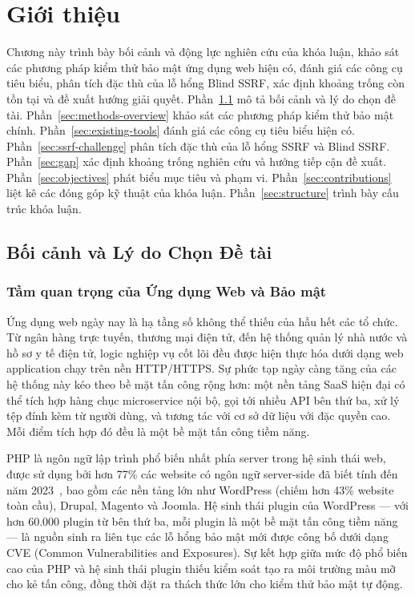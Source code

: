 ﻿\chapter{Giới thiệu}

Chương này trình bày bối cảnh và động lực nghiên cứu của khóa luận, khảo sát các
phương pháp kiểm thử bảo mật ứng dụng web hiện có, đánh giá các công cụ tiêu biểu,
phân tích đặc thù của lỗ hổng Blind SSRF, xác định khoảng trống còn tồn tại và đề
xuất hướng giải quyết.
Phần~\ref{sec:motivation} mô tả bối cảnh và lý do chọn đề tài.
Phần~\ref{sec:methods-overview} khảo sát các phương pháp kiểm thử bảo mật chính.
Phần~\ref{sec:existing-tools} đánh giá các công cụ tiêu biểu hiện có.
Phần~\ref{sec:ssrf-challenge} phân tích đặc thù của lỗ hổng SSRF và Blind SSRF.
Phần~\ref{sec:gap} xác định khoảng trống nghiên cứu và hướng tiếp cận đề xuất.
Phần~\ref{sec:objectives} phát biểu mục tiêu và phạm vi.
Phần~\ref{sec:contributions} liệt kê các đóng góp kỹ thuật của khóa luận.
Phần~\ref{sec:structure} trình bày cấu trúc khóa luận.

\section{Bối cảnh và Lý do Chọn Đề tài}
\label{sec:motivation}

\subsection{Tầm quan trọng của Ứng dụng Web và Bảo mật}

Ứng dụng web ngày nay là hạ tầng số không thể thiếu của hầu hết các tổ chức. Từ
ngân hàng trực tuyến, thương mại điện tử, đến hệ thống quản lý nhà nước và hồ sơ y
tế điện tử, logic nghiệp vụ cốt lõi đều được hiện thực hóa dưới dạng web application
chạy trên nền HTTP/HTTPS. Sự phức tạp ngày càng tăng của các hệ thống này kéo theo
bề mặt tấn công rộng hơn: một nền tảng SaaS hiện đại có thể tích hợp hàng chục
microservice nội bộ, gọi tới nhiều API bên thứ ba, xử lý tệp đính kèm từ người dùng,
và tương tác với cơ sở dữ liệu với đặc quyền cao. Mỗi điểm tích hợp đó đều là một
bề mặt tấn công tiềm năng.

PHP là ngôn ngữ lập trình phổ biến nhất phía server trong hệ sinh thái web, được sử
dụng bởi hơn 77\% các website có ngôn ngữ server-side đã biết tính đến năm
2023~\cite{w3techs2023php}, bao gồm các nền tảng lớn như WordPress (chiếm hơn
43\% website toàn cầu), Drupal, Magento và Joomla. Hệ sinh thái plugin của WordPress
--- với hơn 60.000 plugin từ bên thứ ba, mỗi plugin là một bề mặt tấn công tiềm năng
--- là nguồn sinh ra liên tục các lỗ hổng bảo mật mới được công bố dưới dạng CVE
(Common Vulnerabilities and Exposures). Sự kết hợp giữa mức độ phổ biến cao của PHP
và hệ sinh thái plugin thiếu kiểm soát tạo ra môi trường màu mỡ cho kẻ tấn công,
đồng thời đặt ra thách thức lớn cho kiểm thử bảo mật tự động.

